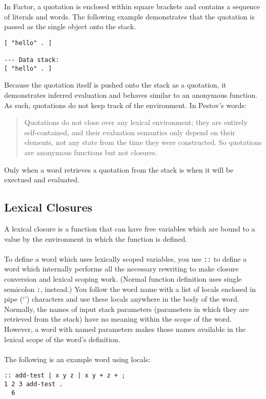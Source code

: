 \documentclass{sig-alternate}
\begin{document}
In Factor, a quotation is enclosed within square brackets and contains a sequence of literals and words.  The following example demonstrates that the quotation is passed as the single object onto the stack.

\begin{verbatim}
[ "hello" . ]

--- Data stack:
[ "hello" . ]
\end{verbatim}

Because the quotation itself is pushed onto the stack as a quotation, it demonstrates inferred evaluation and behaves similar to an anonymous function.  As such, quotations do not keep track of the environment. In Pestov's words:
\begin{quotation}
Quotations do not close over any lexical environment; they are entirely self-contained, and their evaluation semantics only depend on their elements, not any state from the time they were constructed.  So quotations are anonymous functions but not closures.\cite{Closures}
\end{quotation}

Only when a word retrieves a quotation from the stack is when it will be exectued and evaluated.

\subsection{Lexical Closures}
A lexical closure is a function that can have free variables which are bound to a value by the environment in which the function is defined.
\\\\
To define a word which uses lexically scoped variables, you use \texttt{::} to define a word which internally performs all the necessary rewriting to make closure conversion and lexical scoping work.\cite{FactorArticle} (Normal function definition uses single semicolon \texttt{:}, instead.)  You follow the word name with a list of locals enclosed in pipe (`\textbar') characters and use these locals anywhere in the body of the word. Normally, the names of input stack parameters (parameters in which they are  retrieved from the stack) have no meaning within the scope of the word.  However, a word with named parameters makes those names available in the lexical scope of the word's definition. 
\\\\
The following is an example word using locals:

\begin{verbatim}
:: add-test | x y z | x y + z + ;
1 2 3 add-test .
  6     
\end{verbatim}
\end{document}

